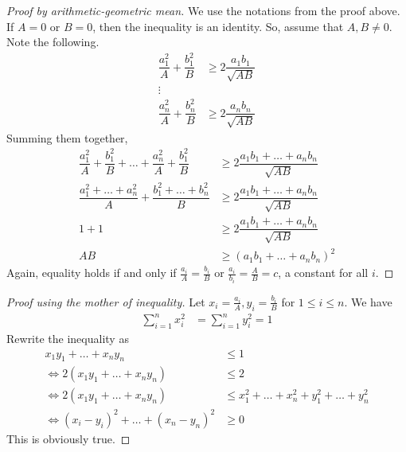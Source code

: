 \documentclass{subfile}
\begin{document}
		\begin{proof}[\itshape Proof by arithmetic-geometric mean]
			We use the notations from the proof above. If $A=0$ or $B=0$, then the inequality is an identity. So, assume that $A,B\neq0$. Note the following.
				\begin{align*}
					\dfrac{a_1^2}{A}+\dfrac{b_1^2}{B}
						& \geq2\dfrac{a_1b_1}{\sqrt{AB}}\\
					\vdots\\
					\dfrac{a_n^2}{A}+\dfrac{b_n^2}{B}
						& \geq2\dfrac{a_nb_n}{\sqrt{AB}}
				\end{align*}
			Summing them together,
				\begin{align*}
					\dfrac{a_1^2}{A}+\dfrac{b_1^2}{B}+\ldots+\dfrac{a_n^2}{A}+\dfrac{b_1^2}{B}
						& \geq2\dfrac{a_1b_1+\ldots+a_nb_n}{\sqrt{AB}}\\
					\dfrac{a_1^2+\ldots+a_n^2}{A}+\dfrac{b_1^2+\ldots+b_n^2}{B}
						& \geq2\dfrac{a_1b_1+\ldots+a_nb_n}{\sqrt{AB}}\\
					1+1
						& \geq2\dfrac{a_1b_1+\ldots+a_nb_n}{\sqrt{AB}}\\
					AB
						& \geq\left(a_1b_1+\ldots+a_nb_n\right)^2
				\end{align*}
			Again, equality holds if and only if $\frac{a_i}{A}=\frac{b_i}{B}$ or $\frac{a_i}{b_i}=\frac{A}{B}=c$, a constant for all $i$.
		\end{proof}

		\begin{proof}[\itshape Proof using the mother of inequality]
			Let $x_i=\frac{a_i}{A},y_i=\frac{b_i}{B}$ for $1\leq i\leq n$. We have
				\begin{align*}
					\sum_{i=1}^nx_i^2
						& = \sum_{i=1}^ny_i^2=1
				\end{align*}
			Rewrite the inequality as
				\begin{align*}
					x_1y_1+\ldots+x_ny_n
						& \leq1\\
					\iff2(x_1y_1+\ldots+x_ny_n)
						& \leq2\\
					\iff2(x_1y_1+\ldots+x_ny_n)
						& \leq x_1^2+\ldots+x_n^2+y_1^2+\ldots+y_n^2\\
					\iff(x_i-y_i)^2+\ldots+(x_n-y_n)^2
						& \geq0
				\end{align*}
			This is obviously true.
		\end{proof}
\end{document}
